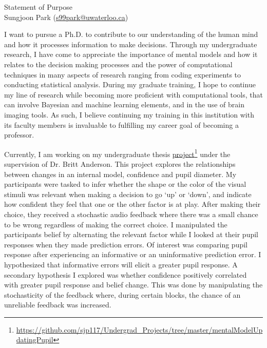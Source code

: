 \documentclass[12pt]{article}
\let\oldcenter\center
\let\oldendcenter\endcenter
\renewenvironment{center}{\setlength\topsep{-1pt}\oldcenter}{\oldendcenter}
\begin{document}
	
	\begin{center}
		{\Large Statement of Purpose} \\
		{\normalsize Sungjoon Park (\href{mailto:s99park@uwaterloo.ca}{s99park@uwaterloo.ca})}
	\end{center}
	
	I want to pursue a Ph.D. to contribute to our understanding of the human mind and how it processes information to make decisions. Through my undergraduate research, I have come to appreciate the importance of mental models and how it relates to the decision making processes and the power of computational techniques in many aspects of research ranging from coding experiments to conducting statistical analysis. During my graduate training, I hope to continue my line of research while becoming more proficient with computational tools, that can involve Bayesian and machine learning elements, and in the use of brain imaging tools. As such, I believe continuing my training in this institution with its faculty members is invaluable to fulfilling my career goal of becoming a professor.
	
	Currently, I am working on my undergraduate thesis \href{https://github.com/sjp117/Undergrad_Projects/tree/master/mentalModelUpdatingPupil}{project}\footnote{\url{https://github.com/sjp117/Undergrad\_Projects/tree/master/mentalModelUpdatingPupil}} under the supervision of Dr. Britt Anderson. This project explores the relationships between changes in an internal model, confidence and pupil diameter. My participants were tasked to infer whether the shape or the color of the visual stimuli was relevant when making a decision to go `up' or `down', and indicate how confident they feel that one or the other factor is at play. After making their choice, they received a stochastic audio feedback where there was a small chance to be wrong regardless of making the correct choice. I manipulated the participants belief by alternating the relevant factor while I looked at their pupil responses when they made prediction errors. Of interest was comparing pupil response after experiencing an informative or an uninformative prediction error. I hypothesized that informative errors will elicit a greater pupil response. A secondary hypothesis I explored was whether confidence positively correlated with greater pupil response and belief change. This was done by manipulating the stochasticity of the feedback where, during certain blocks, the chance of an unreliable feedback was increased.
	
\end{document}
